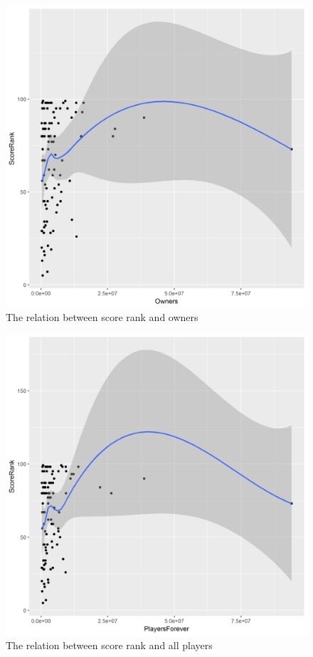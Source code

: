 \documentclass[figures_tabs.tex]{subfiles}
\begin{document}
\begin{figure}[H]
    \centering
    \includegraphics[scale=0.5]{img/owners.png}
    \caption{The relation between score rank and owners}
    \label{fig:owners}
\end{figure}
\begin{figure}[H]
    \centering
    \includegraphics[scale=0.5]{img/players_f.png}
    \caption{The relation between score rank and all players}
    \label{fig:players_f}
\end{figure}
\end{document}
